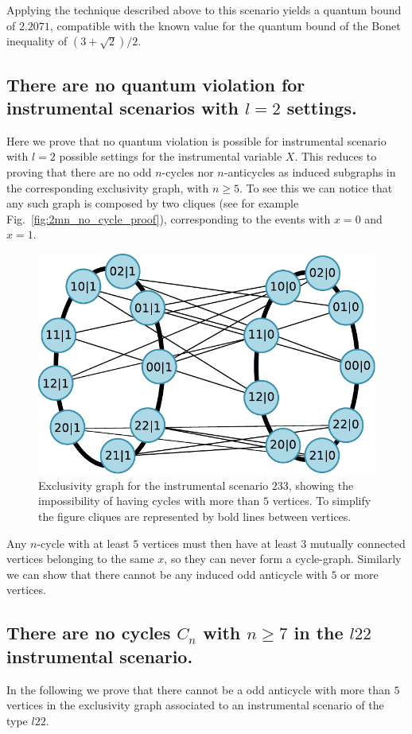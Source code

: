 \documentclass[letterpaper]{article}
\begin{document}
Applying the technique described above to this scenario yields a quantum
bound of $2.2071$, compatible with the known value for the quantum bound of
the Bonet inequality of $(3+\sqrt{2})/2$.

\subsection*{There are no quantum violation for instrumental scenarios with $l=2$
settings.}
Here we prove that no quantum violation is possible for instrumental scenario
with $l=2$ possible settings for the instrumental variable $X$.
This reduces to proving that there are no odd $n$-cycles nor $n$-anticycles as induced
subgraphs in the corresponding exclusivity graph, with $n\ge5$.
To see this we can notice that any such graph is composed by two cliques (see
for example Fig.~\ref{fig:2mn_no_cycle_proof}), corresponding to the events with $x=0$ and
$x=1$.
\begin{figure}[h]
    \centering
    \includegraphics[width=.7\columnwidth]{images/nocycles_proof.pdf}
    \caption{Exclusivity graph for the instrumental scenario $233$, showing the
        impossibility of having cycles with more than $5$ vertices. To simplify the figure cliques are
    represented by bold lines between vertices.}
    \label{fig:2mn_nocycle_proof}
\end{figure}
Any $n$-cycle with at least $5$ vertices must then have at least $3$ mutually
connected vertices belonging to the same $x$, so they can never form a
cycle-graph.
Similarly we can show that there cannot be any induced odd anticycle with $5$ or more
vertices.

\subsection*{There are no cycles $C_n$ with $n \ge 7$ in the $l22$ instrumental scenario.}
In the following we prove that there cannot be a odd anticycle with more than
$5$ vertices in the exclusivity graph associated to an instrumental scenario of
the type $l22$.
\end{document}
